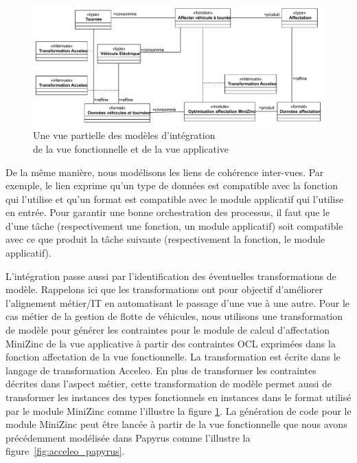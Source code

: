\begin{figure}[!htbp]
  \centering
  \includegraphics[trim= 0cm 0cm 0cm 0cm, clip, width=1\textwidth]{figures/5_implementation/integration_affectation.pdf}
 \caption{Une vue partielle des modèles d'intégration \\de la vue fonctionnelle et de la vue applicative}
 \label{fig:integration_gestion_flotte}
\end{figure}

De la même manière, nous modélisons les liens de cohérence inter-vues. Par
exemple, le lien  exprime qu'un type de données est compatible avec
la fonction qui l'utilise et qu'un format est compatible avec le module
applicatif qui l'utilise en entrée. Pour garantir une bonne orchestration des
processus, il faut que le  d'une tâche (respectivement une fonction,
un module applicatif) soit compatible avec ce que produit la tâche suivante
(respectivement la fonction, le module applicatif).

L'intégration passe aussi par l'identification des éventuelles transformations de
modèle. Rappelons ici que les transformations ont pour objectif d'améliorer
l'alignement métier/IT en automatisant le passage d'une vue à une autre. Pour le
cas métier de la gestion de flotte de véhicules, nous utilisons une
transformation de modèle pour générer les contraintes pour le module de calcul
d'affectation MiniZinc de la vue applicative à partir des contraintes OCL
exprimées dans la fonction affectation de la vue fonctionnelle. La
transformation est écrite dans le langage de transformation Acceleo. En plus de
transformer les contraintes décrites dans l'aspect métier, cette transformation
de modèle permet aussi de transformer les instances des types fonctionnels en
instances dans le format  utilisé par le module MiniZinc comme
l'illustre la figure \ref{fig:integration_gestion_flotte}. La génération de code
pour le module MiniZinc peut être lancée à partir de la vue fonctionnelle que
nous avons précédemment modélisée dans Papyrus comme l'illustre la
figure~\ref{fig:acceleo_papyrus}.


